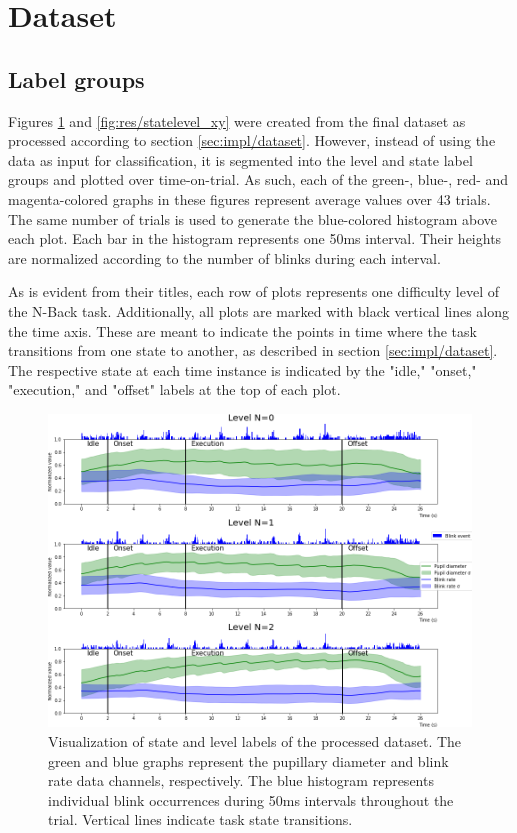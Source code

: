 \section{Dataset} \label{sec:res_dataset}

\subsection{Label groups}

Figures \ref{fig:res/statelevel_pbr} and \ref{fig:res/statelevel_xy} were created from the final dataset as processed according to section \ref{sec:impl/dataset}. However, instead of using the data as input for classification, it is segmented into the level and state label groups and plotted over time-on-trial. As such, each of the green-, blue-, red- and magenta-colored graphs in these figures represent average values over 43 trials. The same number of trials is used to generate the blue-colored histogram above each plot. Each bar in the histogram represents one 50ms interval. Their heights are normalized according to the number of blinks during each interval.

As is evident from their titles, each row of plots represents one difficulty level of the N-Back task. Additionally, all plots are marked with black vertical lines along the time axis. These are meant to indicate the points in time where the task transitions from one state to another, as described in section \ref{sec:impl/dataset}. The respective state at each time instance is indicated by the "idle," "onset," "execution," and "offset" labels at the top of each plot.

\begin{figure}[h]
    \centering
    \includegraphics[width=\textwidth]{figures/impl_statelevelvisualization_pbr.png}
    \caption{Visualization of state and level labels of the processed dataset. The green and blue graphs represent the pupillary diameter and blink rate data channels, respectively. The blue histogram represents individual blink occurrences during 50ms intervals throughout the trial. Vertical lines indicate task state transitions.}
    \label{fig:res/statelevel_pbr}
\end{figure}

